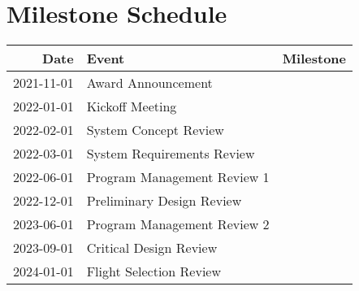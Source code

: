 \section{Milestone Schedule}

\begin{tabular}{rll}
\hline
Date & Event & Milestone\\
\hline
2021-11-01 & Award Announcement & \\
2022-01-01 & Kickoff Meeting & \\
2022-02-01 & System Concept Review & \\
2022-03-01 & System Requirements Review & \\
2022-06-01 & Program Management Review 1 & \\
2022-12-01 & Preliminary Design Review & \\
2023-06-01 & Program Management Review 2 & \\
2023-09-01 & Critical Design Review & \\
2024-01-01 & Flight Selection Review & \\
\hline
\end{tabular}

\pagebreak
